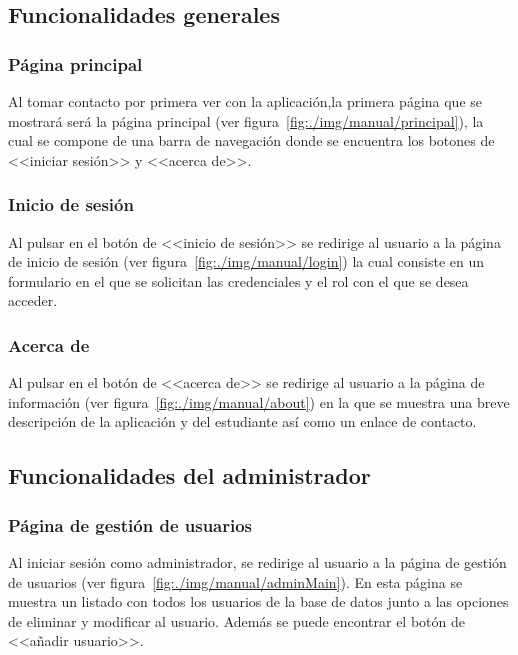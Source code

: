 \subsection{Funcionalidades generales}
\subsubsection{Página principal}
Al tomar contacto por primera ver con la aplicación,la  primera página que se mostrará será la página principal (ver figura~\ref{fig:./img/manual/principal}), la cual se compone de una barra de navegación donde se encuentra los botones de <<iniciar sesión>> y <<acerca de>>.


\subsubsection{Inicio de sesión}
Al pulsar en el botón de <<inicio de sesión>> se redirige al usuario a la página de inicio de sesión (ver figura~\ref{fig:./img/manual/login}) la cual consiste en un formulario en el que se solicitan las credenciales y el rol con el que se desea acceder.


\subsubsection{Acerca de}
Al pulsar en el botón de <<acerca de>> se redirige al usuario a la página de información (ver figura~\ref{fig:./img/manual/about}) en la que se muestra una breve descripción de la aplicación y del estudiante así como un enlace de contacto.


\subsection{Funcionalidades del administrador}

\subsubsection{Página de gestión de usuarios}

Al iniciar sesión como administrador, se redirige al usuario a la página de gestión de usuarios (ver figura~\ref{fig:./img/manual/adminMain}). En esta página se muestra un listado con todos los usuarios de la base de datos junto a las opciones de eliminar y modificar al usuario. Además se puede encontrar el botón de <<añadir usuario>>.

